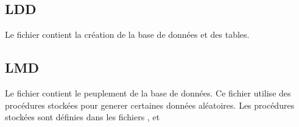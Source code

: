 \documentclass{article}
\begin{document}
\subsection{LDD}
Le fichier \href{https://github.com/ZGaillard/projet_session_2935/blob/main/database/create.sql}{} contient la création de la base de données et des tables.


\subsection{LMD}
Le fichier
\href{https://github.com/ZGaillard/projet_session_2935/blob/main/database/Populate.sql}{}
contient le peuplement de la base de données. Ce fichier utilise des
procédures stockées pour generer certaines données aléatoires.
Les procédures stockées sont définies dans les fichiers 
  \href{https://github.com/ZGaillard/projet_session_2935/blob/main/database/GenCastingArtistes.sql}{},
  \href{https://github.com/ZGaillard/projet_session_2935/blob/main/database/GenArtisteSport.sql}{}
  et
  \href{https://github.com/ZGaillard/projet_session_2935/blob/main/database/GenArtisteHabit.sql
  }{}


\subsection{}
\end{document}
